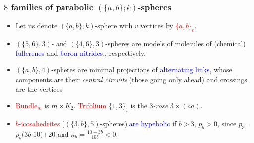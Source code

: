 \documentclass{beamer}
\begin{document}
\begin{frame}\frametitle{$8$ families of parabolic $(\{a,b\};k)$-spheres}
 \begin{itemize}

\item Let us denote $(\{a,b\};k)$-sphere with $v$ vertices by
\textcolor{red}{$\{a,b\}_v$}.
\bigskip


\item $(\{5,6\},3)$- and $(\{4,6\},3)$-spheres are  models of molecules of 
(chemical) \textcolor{blue}{fullerenes} and \textcolor{blue}{boron nitrides}., respectively.

\item $(\{a,b\},4)$-spheres are minimal projections of  
\textcolor{blue}{alternating links}, 
whose
components are their  {\em central circuits} 
 (those going only ahead) and crossings are the vertices.
\bigskip

\item \textcolor{red}{Bundle$_m$} is $m\times K_2$. 
\textcolor{red}{Trifolium}  $\{1,3\}_1$ is the {\em $3$-rose} $3\times (aa)$. 
\bigskip


\item \textcolor{red}{$b$-icosahedrites} ($(\{3,b\},5)$-spheres) \textcolor{blue}
{are hypebolic} if $b$$>$$3$, $p_b$$>$$0$, since $p_3$=$p_b(3b$-$10)$+$20$ and 
$\kappa_b=\frac{10-3b}{10b}<0$.
\end{itemize}
\end{frame}
\end{document}
